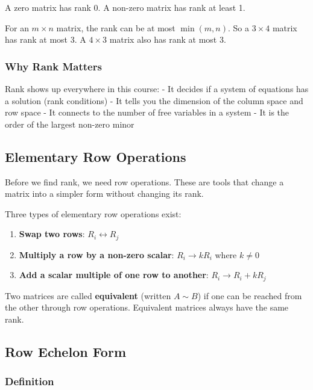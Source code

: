 \documentclass[
]{article}
\providecommand{\tightlist}{%
  \setlength{\itemsep}{0pt}\setlength{\parskip}{0pt}}
\begin{document}
A zero matrix has rank 0. A non-zero matrix has rank at least 1.

For an \(m \times n\) matrix, the rank can be at most \(\min(m, n)\). So
a \(3 \times 4\) matrix has rank at most 3. A \(4 \times 3\) matrix also
has rank at most 3.

\subsubsection{Why Rank Matters}\label{why-rank-matters}

Rank shows up everywhere in this course: - It decides if a system of
equations has a solution (rank conditions) - It tells you the dimension
of the column space and row space - It connects to the number of free
variables in a system - It is the order of the largest non-zero minor

\subsection{Elementary Row Operations}\label{elementary-row-operations}

Before we find rank, we need row operations. These are tools that change
a matrix into a simpler form without changing its rank.

Three types of elementary row operations exist:

\begin{enumerate}
\def\labelenumi{\arabic{enumi}.}
\tightlist
\item
  \textbf{Swap two rows}: \(R_i \leftrightarrow R_j\)
\item
  \textbf{Multiply a row by a non-zero scalar}: \(R_i \to kR_i\) where
  \(k \neq 0\)
\item
  \textbf{Add a scalar multiple of one row to another}:
  \(R_i \to R_i + kR_j\)
\end{enumerate}

Two matrices are called \textbf{equivalent} (written \(A \sim B\)) if
one can be reached from the other through row operations. Equivalent
matrices always have the same rank.

\subsection{Row Echelon Form}\label{row-echelon-form}

\subsubsection{Definition}\label{definition-11}
\end{document}
